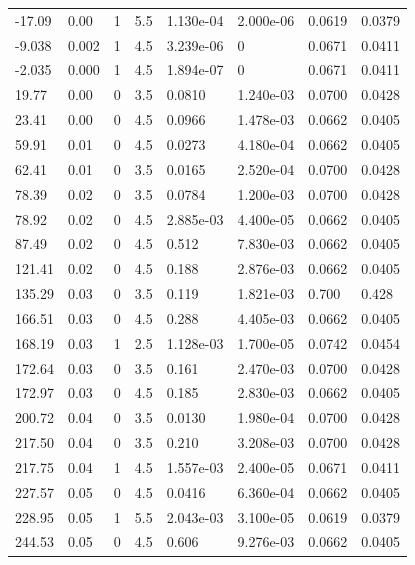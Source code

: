 \documentclass[preview]{standalone}
\begin{document}
{{\begin{tabular}{L{1.2cm}C{1.2cm} C{0.3cm}C{0.5cm} C{1.4cm}C{1.4cm} C{1.4cm}C{1.4cm}}
  -17.09  &  0.00  & 1     & 5.5 &  1.130e-04  & 2.000e-06  & 0.0619 &  0.0379   \\ 
  -9.038  &  0.002  & 1     & 4.5 &  3.239e-06  & 0  & 0.0671 &  0.0411   \\ 
  -2.035  &  0.000  & 1     & 4.5 &  1.894e-07  & 0  & 0.0671 &  0.0411   \\ 
  19.77  &  0.00  & 0     & 3.5 &  0.0810  & 1.240e-03  & 0.0700 &  0.0428   \\ 
  23.41  &  0.00  & 0     & 4.5 &  0.0966  & 1.478e-03  & 0.0662 &  0.0405   \\ 
  59.91  &  0.01  & 0     & 4.5 &  0.0273  & 4.180e-04  & 0.0662 &  0.0405   \\ 
  62.41  &  0.01  & 0     & 3.5 &  0.0165  & 2.520e-04  & 0.0700 &  0.0428   \\ 
  78.39  &  0.02  & 0     & 3.5 &  0.0784  & 1.200e-03  & 0.0700 &  0.0428   \\ 
  78.92  &  0.02  & 0     & 4.5 &  2.885e-03  & 4.400e-05  & 0.0662 &  0.0405   \\ 
  87.49  &  0.02  & 0     & 4.5 &  0.512  & 7.830e-03  & 0.0662 &  0.0405   \\ 
  121.41  &  0.02  & 0     & 4.5 &  0.188  & 2.876e-03  & 0.0662 &  0.0405   \\ 
  135.29  &  0.03  & 0     & 3.5 &  0.119  & 1.821e-03  & 0.700 &  0.428   \\ 
  166.51  &  0.03  & 0     & 4.5 &  0.288  & 4.405e-03  & 0.0662 &  0.0405   \\ 
  168.19  &  0.03  & 1     & 2.5 &  1.128e-03  & 1.700e-05  & 0.0742 &  0.0454   \\ 
  172.64  &  0.03  & 0     & 3.5 &  0.161  & 2.470e-03  & 0.0700 &  0.0428   \\ 
  172.97  &  0.03  & 0     & 4.5 &  0.185  & 2.830e-03  & 0.0662 &  0.0405   \\ 
  200.72  &  0.04  & 0     & 3.5 &  0.0130  & 1.980e-04  & 0.0700 &  0.0428   \\ 
  217.50  &  0.04  & 0     & 3.5 &  0.210  & 3.208e-03  & 0.0700 &  0.0428   \\ 
  217.75  &  0.04  & 1     & 4.5 &  1.557e-03  & 2.400e-05  & 0.0671 &  0.0411   \\ 
  227.57  &  0.05  & 0     & 4.5 &  0.0416  & 6.360e-04  & 0.0662 &  0.0405   \\ 
  228.95  &  0.05  & 1     & 5.5 &  2.043e-03  & 3.100e-05  & 0.0619 &  0.0379   \\ 
  244.53  &  0.05  & 0     & 4.5 &  0.606  & 9.276e-03  & 0.0662 &  0.0405   \\ 

\end{tabular}}}
\end{document}
